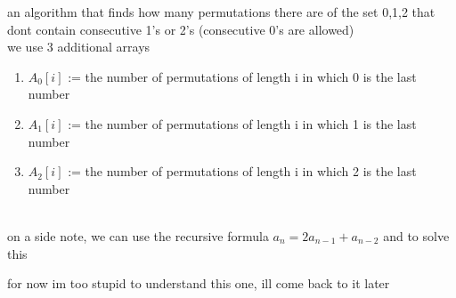 \documentclass[a4paper,12pt]{article}
\begin{document}
\begin{my_example}
an algorithm that finds how many permutations there are of the set 0,1,2 that dont contain consecutive 1's or 2's (consecutive 0's are allowed)\\[0pt]
we use 3 additional arrays\\[0pt]
\begin{enumerate}
\item \(A_0[i]\) := the number of permutations of length i in which 0 is the last number\\[0pt]
\item \(A_1[i]\) := the number of permutations of length i in which 1 is the last number\\[0pt]
\item \(A_2[i]\) := the number of permutations of length i in which 2 is the last number\\[0pt]
\end{enumerate}
\\[0pt]

on a side note, we can use the recursive formula \(a_n=2a_{n-1}+a_{n-2}\) and to solve this\\[0pt]
\begin{note}
for now im too stupid to understand this one, ill come back to it later\\[0pt]
\end{note}
\end{my_example}
\end{document}
